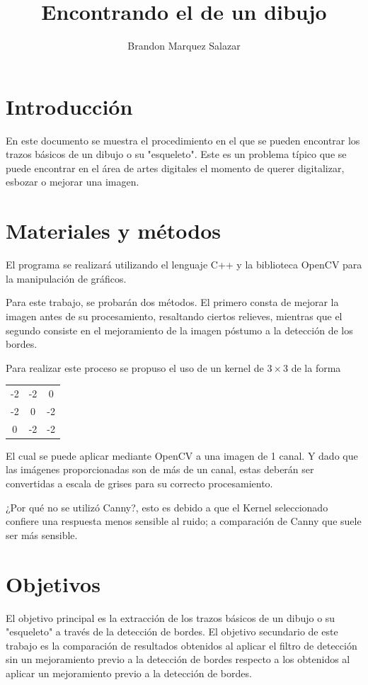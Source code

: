\documentclass[10pt]{IEEEtran}
\title{Encontrando el \say{esqueleto} de un dibujo}
\author{ Brandon Marquez Salazar }
\begin{document}
  \maketitle
  \section{Introducción}
  En este documento se muestra el procedimiento en el que se pueden encontrar los trazos básicos de un dibujo o su "esqueleto". Este es un problema típico que se puede encontrar en el área de artes digitales
  el momento de querer digitalizar, esbozar o mejorar una imagen.

  \section{Materiales y métodos}
  El programa se realizará utilizando el lenguaje C++ y la biblioteca OpenCV para la manipulación de gráficos.

  Para este trabajo, se probarán dos métodos. El primero consta de mejorar la imagen antes de su procesamiento, resaltando ciertos relieves,
  mientras que el segundo consiste en el mejoramiento de la imagen póstumo a la detección de los bordes.

  Para realizar este proceso se propuso el uso de un kernel de $3\times3$ de la forma

  \begin{center}
    \begin{tabular}{ c c c }
      -2 & -2 &  0\\
      -2 &  0 & -2\\
      0 & -2 & -2
    \end{tabular}
  \end{center}

  El cual se puede aplicar mediante OpenCV a una imagen de 1 canal. Y dado que las imágenes proporcionadas son de más de un canal,
  estas deberán ser convertidas a escala de grises para su correcto procesamiento.

  ¿Por qué no se utilizó Canny?, esto es debido a que el Kernel seleccionado confiere una respuesta menos sensible al ruido; a comparación de
  Canny que suele ser más sensible.

  \section{Objetivos}
  El objetivo principal es la extracción de los trazos básicos de un dibujo o su "esqueleto" a través de la detección de bordes.
  El objetivo secundario de este trabajo es la comparación de resultados obtenidos al aplicar el filtro de detección sin un mejoramiento
  previo a la detección de bordes respecto a los obtenidos al aplicar un mejoramiento previo a la detección de bordes.
\end{document}
